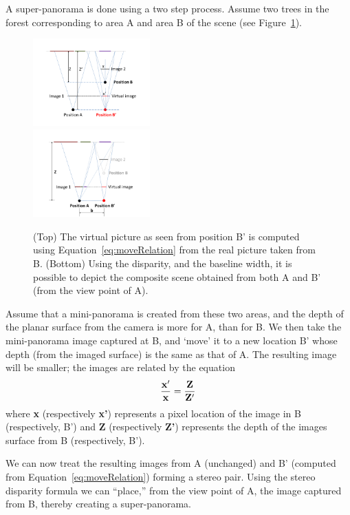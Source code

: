 \documentclass[10pt,twocolumn,letterpaper]{article}
\begin{document}
A super-panorama is done using a two step process. Assume two trees in
the forest corresponding to area A and area B of the scene (see
Figure~\ref{fig:stereo}). 
\begin{figure}[h!]
  \centering
  \includegraphics[width=0.4\textwidth]{figures/move} \\
  \includegraphics[width=0.4\textwidth]{figures/stereo} 
  \caption{ \label{fig:stereo} (Top) The virtual picture as seen from position
  B' is computed using Equation~\ref{eq:moveRelation} from the real picture
    taken from B.  (Bottom) Using the disparity, and the baseline width,
  it is possible to depict the composite scene obtained from both A
  and B' (from the view point of A).}
\end{figure}    
Assume that a mini-panorama is created from these two areas, and the
depth of the planar surface from the camera is more for A, than for
B. We then take the mini-panorama image captured at B, and `move' it to
a new location B’ whose depth (from the imaged surface) is the same as
that of A. The resulting image  will be smaller; the images are
related by the equation
\begin{equation}
  \label{eq:moveRelation}
  {\bf \frac{x'}{x} = \frac{Z}{Z'}}
\end{equation}
where {\bf x} (respectively {\bf x'}) represents a pixel location of
the image in B (respectively, B') and 
{\bf Z} (respectively {\bf Z'}) represents the depth of the images
surface from B (respectively, B').

We can now treat the resulting images from A (unchanged) and B’
(computed from Equation~\ref{eq:moveRelation}) forming a stereo pair.
Using the stereo disparity formula we can ``place,'' from the view
point of A, the image captured from B, thereby creating a
super-panorama.
\end{document}
